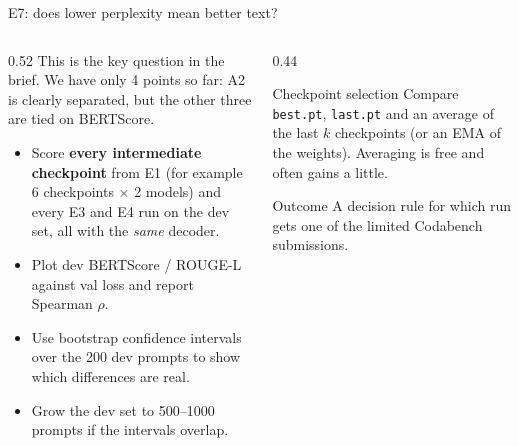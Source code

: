 \documentclass[aspectratio=169,11pt]{beamer}
\newcommand{\code}[1]{\texttt{\small #1}}
\begin{document}
\begin{frame}{E7: does lower perplexity mean better text?}
  \begin{columns}[T]
    \begin{column}{0.52\textwidth}
      \small
      This is the key question in the brief. We have only 4 points so far: A2 is clearly separated, but the other three are tied on BERTScore.
      \begin{itemize}
        \item Score \textbf{every intermediate checkpoint} from E1 (for example 6 checkpoints $\times$ 2 models) and every E3 and E4 run on the dev set, all with the \emph{same} decoder.
        \item Plot dev BERTScore / ROUGE-L against val loss and report Spearman $\rho$.
        \item Use bootstrap confidence intervals over the 200 dev prompts to show which differences are real.
        \item Grow the dev set to 500--1000 prompts if the intervals overlap.
      \end{itemize}
    \end{column}
    \begin{column}{0.44\textwidth}
      \begin{block}{Checkpoint selection}
        \small Compare \code{best.pt}, \code{last.pt} and an average of the last $k$ checkpoints (or an EMA of the weights). Averaging is free and often gains a little.
      \end{block}
      \begin{exampleblock}{Outcome}
        \small A decision rule for which run gets one of the limited Codabench submissions.
      \end{exampleblock}
    \end{column}
  \end{columns}
\end{frame}
\end{document}
